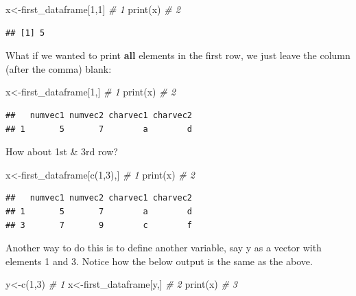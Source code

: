 \documentclass[
]{book}
\newenvironment{Shaded}{\begin{snugshade}}{\end{snugshade}}
\newcommand{\CommentTok}[1]{\textcolor[rgb]{0.56,0.35,0.01}{\textit{#1}}}
\newcommand{\DecValTok}[1]{\textcolor[rgb]{0.00,0.00,0.81}{#1}}
\newcommand{\FunctionTok}[1]{\textcolor[rgb]{0.00,0.00,0.00}{#1}}
\newcommand{\NormalTok}[1]{#1}
\newcommand{\OtherTok}[1]{\textcolor[rgb]{0.56,0.35,0.01}{#1}}
\begin{document}
\begin{Shaded}
\begin{Highlighting}[numbers=left,,]
\NormalTok{x}\OtherTok{\textless{}{-}}\NormalTok{first\_dataframe[}\DecValTok{1}\NormalTok{,}\DecValTok{1}\NormalTok{]  }\CommentTok{\# 1}
\FunctionTok{print}\NormalTok{(x)                 }\CommentTok{\# 2}
\end{Highlighting}
\end{Shaded}

\begin{verbatim}
## [1] 5
\end{verbatim}

What if we wanted to print \textbf{all} elements in the first row, we just leave the column (after the comma) blank:

\begin{Shaded}
\begin{Highlighting}[numbers=left,,]
\NormalTok{x}\OtherTok{\textless{}{-}}\NormalTok{first\_dataframe[}\DecValTok{1}\NormalTok{,]  }\CommentTok{\# 1}
\FunctionTok{print}\NormalTok{(x)                }\CommentTok{\# 2}
\end{Highlighting}
\end{Shaded}

\begin{verbatim}
##   numvec1 numvec2 charvec1 charvec2
## 1       5       7        a        d
\end{verbatim}

How about 1st \& 3rd row?

\begin{Shaded}
\begin{Highlighting}[numbers=left,,]
\NormalTok{x}\OtherTok{\textless{}{-}}\NormalTok{first\_dataframe[}\FunctionTok{c}\NormalTok{(}\DecValTok{1}\NormalTok{,}\DecValTok{3}\NormalTok{),]  }\CommentTok{\# 1}
\FunctionTok{print}\NormalTok{(x)                     }\CommentTok{\# 2}
\end{Highlighting}
\end{Shaded}

\begin{verbatim}
##   numvec1 numvec2 charvec1 charvec2
## 1       5       7        a        d
## 3       7       9        c        f
\end{verbatim}

Another way to do this is to define another variable, say y as a vector with elements 1 and 3. Notice how the below output is the same as the above.

\begin{Shaded}
\begin{Highlighting}[numbers=left,,]
\NormalTok{y}\OtherTok{\textless{}{-}}\FunctionTok{c}\NormalTok{(}\DecValTok{1}\NormalTok{,}\DecValTok{3}\NormalTok{)               }\CommentTok{\# 1}
\NormalTok{x}\OtherTok{\textless{}{-}}\NormalTok{first\_dataframe[y,]  }\CommentTok{\# 2}
\FunctionTok{print}\NormalTok{(x)                }\CommentTok{\# 3}
\end{Highlighting}
\end{Shaded}
\end{document}
